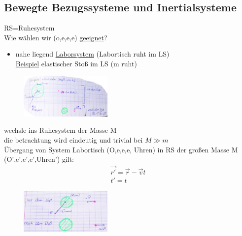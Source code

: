 \subsection{Bewegte Bezugssysteme und Inertialsysteme}
RS=Ruhesystem\\
Wie wählen wir (o,e,e,e) \underline{geeignet}?\\
\begin{itemize}
\item nahe liegend \underline{Laborsystem} (Labortisch ruht im LS)\\
\underline{Beispiel} elastischer Stoß im LS (m ruht)
\end{itemize}
\begin{figure}[h]
\begin{center}
\includegraphics[width=0.4\textwidth]{Skizzen/Anhang6.jpg}
\end{center}
\caption{}
\end{figure}
\newpage
wechsle ins Ruhesystem der Masse M\\
die betrachtung wird eindeutig und trivial bei $M\gg m$\\
Übergang von System Labortisch (O,e,e,e, Uhren) in RS der großen Masse M (O',e',e',e',Uhren') gilt:
\begin{align*}
\vec{r'}=\vec{r}-\vec{v}t\\
t'=t
\end{align*}
\begin{figure}[h]
\begin{center}
\includegraphics[width=0.4\textwidth]{Skizzen/Anhang5.jpg}
\end{center}
\caption{}
\end{figure}

